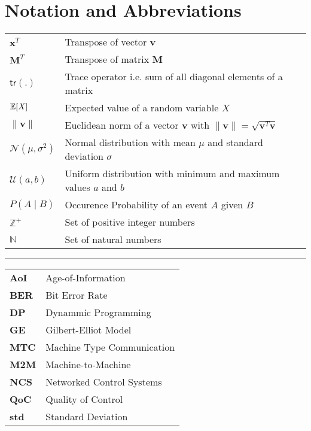 \chapter*{Notation and Abbreviations}

\begin{tabular}{p{2cm} l} 
$\mathbf{x}^T$ & Transpose of vector $\mathbf{v}$\\
$\mathbf{M}^T$ & Transpose of matrix $\mathbf{M}$\\
$\mathsf{tr(.)}$ & Trace operator i.e. sum of all diagonal elements of a matrix\\
$\mathbb{E}[\mathit{X}]$ & Expected value of a random variable $\mathit{X}$\\
$\|\mathbf{v}\|$ & Euclidean norm of a vector $\mathbf{v}$ with $\|\mathbf{v}\|=\sqrt{\mathbf{v} ^T\mathbf{v}}$\\
$\mathcal{N}(\mu,\sigma^2)$ & Normal distribution with mean $\mu$ and standard deviation $\sigma$\\
$\mathcal{U}(a,b)$ & Uniform distribution with minimum and maximum values $a$ and $b$\\
$P(A \mid B)$ & Occurence Probability of an event $A$ given $B$\\
$\mathbb{Z}^+$ & Set of positive integer numbers\\
$\mathbb{N}$ & Set of natural numbers\\
\end{tabular}
\vspace{1cm}

\hrule
\vspace{1cm}
  
\begin{tabular}{>{\bfseries}p{2cm} l}
AoI & Age-of-Information\\
BER & Bit Error Rate\\
DP & Dynammic Programming\\
GE & Gilbert-Elliot Model\\
MTC & Machine Type Communication\\
M2M & Machine-to-Machine\\
NCS & Networked Control Systems\\
QoC & Quality of Control\\
std & Standard Deviation\\
\end{tabular}
